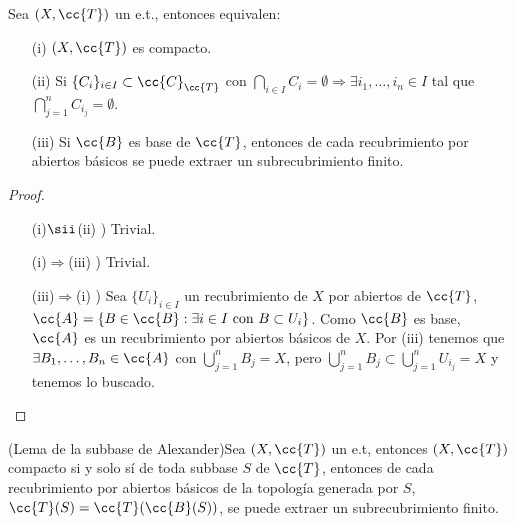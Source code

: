 \begin{prop}
    Sea $(X, \cc{T})$ un e.t., entonces equivalen:
    \begin{enumerate}
        \item[(i)] $(X, \cc{T})$ es compacto.
        \item[(ii)] Si $\{C_i\}_{i\in I} \subset \cc{C}_{\cc{T}}$ con $\bigcap\limits_{i\in I}C_i = \emptyset \Rightarrow \exists i_1,\dots,i_n\in I$ tal que $\bigcap\limits_{j=1}^n C_{i_j}=\emptyset$.
        \item[(iii)] Si $\cc{B}$ es base de $\cc{T}$, entonces de cada recubrimiento por abiertos básicos se puede extraer un subrecubrimiento finito.
    \end{enumerate}
    \begin{proof}\
        \begin{itemize}
            \item[(i)$\sii$(ii) )] Trivial.
            \item[(i)$\Rightarrow$(iii) )] Trivial.
            \item[(iii)$\Rightarrow$(i) )] Sea $\{U_i\}_{i\in I}$ un recubrimiento de $X$ por abiertos de $\cc{T}$, $\cc{A}=\{B\in \cc{B} : \exists i \in I \text{ con }B\subset U_i\}$. Como $\cc{B}$ es base, $\cc{A}$ es un recubrimiento por abiertos básicos de $X$. Por (iii) tenemos que $\exists B_1,\dots,B_n\in \cc{A}$ con $\bigcup\limits_{j=1}^n B_j = X$, pero $\bigcup\limits_{j=1}^n B_j \subset \bigcup\limits_{j=1}^n U_{i_j} = X$ y tenemos lo buscado.
        \end{itemize}
    \end{proof}
\end{prop}

\begin{lema}
    (Lema de la subbase de Alexander)Sea $(X, \cc{T})$ un e.t, entonces $(X, \cc{T})$ compacto si y solo sí de toda subbase $S$ de $\cc{T}$, entonces de cada recubrimiento por abiertos básicos de la topología generada por $S$, $\cc{T}(S) = \cc{T}(\cc{B}(S))$, se puede extraer un subrecubrimiento finito.
    \endsquare %
\end{lema}

